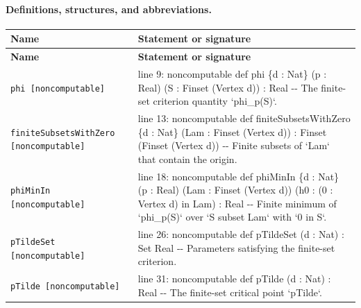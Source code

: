 \documentclass[10pt]{article}
\begin{document}
\paragraph{Definitions, structures, and abbreviations.}
\begin{longtable}{>{\raggedright\arraybackslash}p{} >{\raggedright\arraybackslash}p{}}
\textbf{Name} & \textbf{Statement or signature} \\
\hline
\endfirsthead
\textbf{Name} & \textbf{Statement or signature} \\
\hline
\endhead
\texttt{phi [noncomputable]} & {\ttfamily\scriptsize line 9:\allowbreak{} noncomputable def phi \{d :\allowbreak{} Nat\} (\allowbreak{}p :\allowbreak{} Real)\allowbreak{} (\allowbreak{}S :\allowbreak{} Finset (\allowbreak{}Vertex d)\allowbreak{})\allowbreak{} :\allowbreak{} Real -\allowbreak{}-\allowbreak{} The finite-\allowbreak{}set criterion quantity `phi\_\allowbreak{}p(\allowbreak{}S)\allowbreak{}`.\allowbreak{}} \\[0.45em]
\texttt{finiteSubsetsWithZero [noncomputable]} & {\ttfamily\scriptsize line 13:\allowbreak{} noncomputable def finiteSubsetsWithZero \{d :\allowbreak{} Nat\} (\allowbreak{}Lam :\allowbreak{} Finset (\allowbreak{}Vertex d)\allowbreak{})\allowbreak{} :\allowbreak{} Finset (\allowbreak{}Finset (\allowbreak{}Vertex d)\allowbreak{})\allowbreak{} -\allowbreak{}-\allowbreak{} Finite subsets of `Lam` that contain the origin.\allowbreak{}} \\[0.45em]
\texttt{phiMinIn [noncomputable]} & {\ttfamily\scriptsize line 18:\allowbreak{} noncomputable def phiMinIn \{d :\allowbreak{} Nat\} (\allowbreak{}p :\allowbreak{} Real)\allowbreak{} (\allowbreak{}Lam :\allowbreak{} Finset (\allowbreak{}Vertex d)\allowbreak{})\allowbreak{} (\allowbreak{}h0 :\allowbreak{} (\allowbreak{}0 :\allowbreak{} Vertex d)\allowbreak{} in Lam)\allowbreak{} :\allowbreak{} Real -\allowbreak{}-\allowbreak{} Finite minimum of `phi\_\allowbreak{}p(\allowbreak{}S)\allowbreak{}` over `S subset Lam` with `0 in S`.\allowbreak{}} \\[0.45em]
\texttt{pTildeSet [noncomputable]} & {\ttfamily\scriptsize line 26:\allowbreak{} noncomputable def pTildeSet (\allowbreak{}d :\allowbreak{} Nat)\allowbreak{} :\allowbreak{} Set Real -\allowbreak{}-\allowbreak{} Parameters satisfying the finite-\allowbreak{}set criterion.\allowbreak{}} \\[0.45em]
\texttt{pTilde [noncomputable]} & {\ttfamily\scriptsize line 31:\allowbreak{} noncomputable def pTilde (\allowbreak{}d :\allowbreak{} Nat)\allowbreak{} :\allowbreak{} Real -\allowbreak{}-\allowbreak{} The finite-\allowbreak{}set critical point `pTilde`.\allowbreak{}} \\[0.45em]
\end{longtable}
\end{document}
